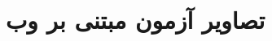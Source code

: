     
\let\Chapter\chapter
    
\chapter{تصاویر آزمون مبتنی بر وب}
\label{app:webbasedtask}
% 
% 



